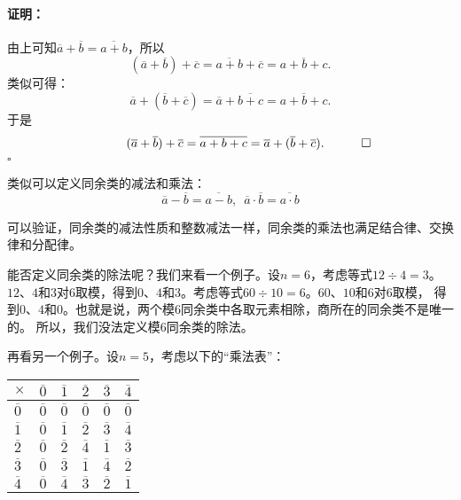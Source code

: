 \documentclass[12pt,UTF8]{ctexbook}
\newenvironment{proof2}{\paragraph{\textbf{证明：}}}{\hfill$\square$}
\begin{document}
\begin{proof2}
    由上可知$ \overline{a} + \overline{b} = \overline{a + b}$，所以
    $$ (\overline{a} + \overline{b}) + \overline{c} = \overline{a + b}+ \overline{c} = \overline{a + b + c}.$$
    类似可得：
    $$ \overline{a} + (\overline{b} + \overline{c}) = \overline{a}+ \overline{b + c} = \overline{a + b + c}.$$
    于是
    $$ \quad \quad \quad (\overline{a} + \overline{b}) + \overline{c}  = \overline{a + b + c} = \overline{a} + (\overline{b} + \overline{c}). \quad \qedhere$$
\end{proof2}

类似可以定义同余类的减法和乘法：
$$ \overline{a} - \overline{b} = \overline{a - b}, \,\,\, \overline{a} \cdot \overline{b} = \overline{a \cdot b}$$

可以验证，同余类的减法性质和整数减法一样，同余类的乘法也满足结合律、交换律和分配律。

能否定义同余类的除法呢？我们来看一个例子。设$n=6$，考虑等式$12 \div 4 = 3$。
$12$、$4$和$3$对$6$取模，得到$0$、$4$和$3$。考虑等式$60 \div 10 = 6$。$60$、$10$和$6$对$6$取模，
得到$0$、$4$和$0$。也就是说，两个模$6$同余类中各取元素相除，商所在的同余类不是唯一的。
所以，我们没法定义模$6$同余类的除法。

再看另一个例子。设$n=5$，考虑以下的“乘法表”：
\begin{center}
    \begin{tabular}{ | p{2em}<{\centering} | p{2em}<{\centering} | p{2em}<{\centering} | p{2em}<{\centering} | p{2em}<{\centering} | p{2em}<{\centering} | }
        \hline
            $\times$   & $\overline{0}$ & $\overline{1}$ & $\overline{2}$ & $\overline{3}$ & $\overline{4}$ \\ [0.5ex] 
        \hline
        $\overline{0}$ & $\overline{0}$ & $\overline{0}$ & $\overline{0}$ & $\overline{0}$ & $\overline{0}$ \\  
        \hline
        $\overline{1}$ & $\overline{0}$ & $\overline{1}$ & $\overline{2}$ & $\overline{3}$ & $\overline{4}$ \\
        \hline
        $\overline{2}$ & $\overline{0}$ & $\overline{2}$ & $\overline{4}$ & $\overline{1}$ & $\overline{3}$ \\
        \hline
        $\overline{3}$ & $\overline{0}$ & $\overline{3}$ & $\overline{1}$ & $\overline{4}$ & $\overline{2}$ \\
        \hline 
        $\overline{4}$ & $\overline{0}$ & $\overline{4}$ & $\overline{3}$ & $\overline{2}$ & $\overline{1}$ \\
        \hline
    \end{tabular}
\end{center}
\end{document}
